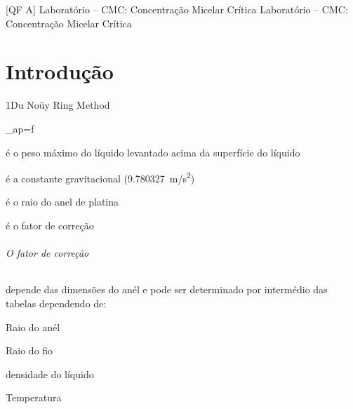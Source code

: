 \documentclass[\mainfilename]{subfiles}
\begin{document}
\graphicspath{{\subfix{./.build/figures/QF_A-Lab.1}}}

[QF A]
{Laboratório -- CMC: Concentração Micelar Crítica} %
{Laboratório -- CMC: Concentração Micelar Crítica} %

\part*{Introdução}

\begin{sectionBox}1{Du Noüy Ring Method} %
    
    \begin{BM}
        \gamma_{ap}=f
    \end{BM}

    \begin{description}[
        leftmargin=!,
        labelwidth=\widthof{M} %
    ]
       \item[M] é o peso máximo do líquido levantado acima da superfície do líquido
       \item[g] é a constante gravitacional (\qty{9.780327}{\metre/\second^2})
       \item[R] é o raio do anel de platina
       \item[F] é o fator de correção
    \end{description}

    \paragraph*{O fator de correção} depende das dimensões do anél e pode ser determinado por intermédio das tabelas dependendo de:
    \begin{itemize}
        \begin{multicols}{2}
            \item Raio do anél
            \item Raio do fio
            \item densidade do líquido
            \item Temperatura
        \end{multicols}
    \end{itemize}
    
\end{sectionBox}
\end{document}
